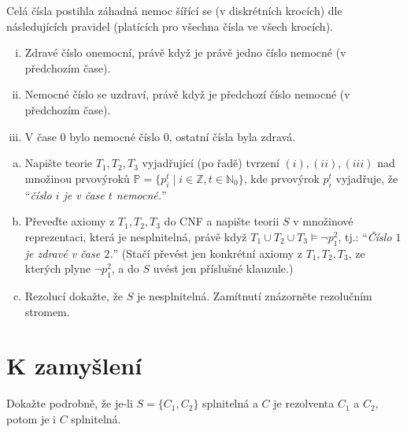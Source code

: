 \documentclass[a4paper,11pt]{amsart}
\begin{document}
\begin{problem}

    Celá čísla postihla záhadná nemoc šířící se (v diskrétních krocích) dle následujících pravidel (platících pro všechna čísla ve všech krocích).
    \begin{enumerate}[(i)]\it
        \item Zdravé číslo onemocní, právě když je právě jedno číslo nemocné (v předchozím čase).
        \item Nemocné číslo se uzdraví, právě když je předchozí číslo nemocné (v předchozím čase).
        \item V čase $0$ bylo nemocné číslo $0$, ostatní čísla byla zdravá.
    \end{enumerate}
    \begin{enumerate}[(a)]
        \item Napište teorie $T_1, T_2, T_3$ vyjadřující (po řadě) tvrzení $(i), (ii), (iii)$ nad množinou prvovýroků $\mathbb{P}=\{p_i^t \mid i\in\mathbb{Z}, t\in\mathbb{N}_0\}$, kde prvovýrok $p_i^t$ vyjadřuje, že ``{\it číslo $i$ je v čase $t$ nemocné.}''
        \item Převeďte axiomy z $T_1, T_2, T_3$ do CNF a napište teorii $S$ v množinové reprezentaci, která je nesplnitelná, právě když $T_1 \cup T_2 \cup T_3 \models \neg p_1^2$, tj.: ``{\it Číslo $1$ je zdravé v čase $2$.}'' (Stačí převést jen konkrétní axiomy z $T_1,T_2,T_3$, ze kterých plyne $\neg p_1^2$, a do $S$ uvést jen příslušné klauzule.)
        \item Rezolucí dokažte, že $S$ je nesplnitelná. Zamítnutí znázorněte rezolučním stromem.
    \end{enumerate}

\end{problem}

        
\section*{K zamyšlení}


\begin{problem}
    Dokažte podrobně, že je-li $S=\{C_1,C_2\}$ splnitelná a $C$ je rezolventa $C_1$ a $C_2$, potom je i $C$ splnitelná.
\end{problem}
       
        
\end{document}
